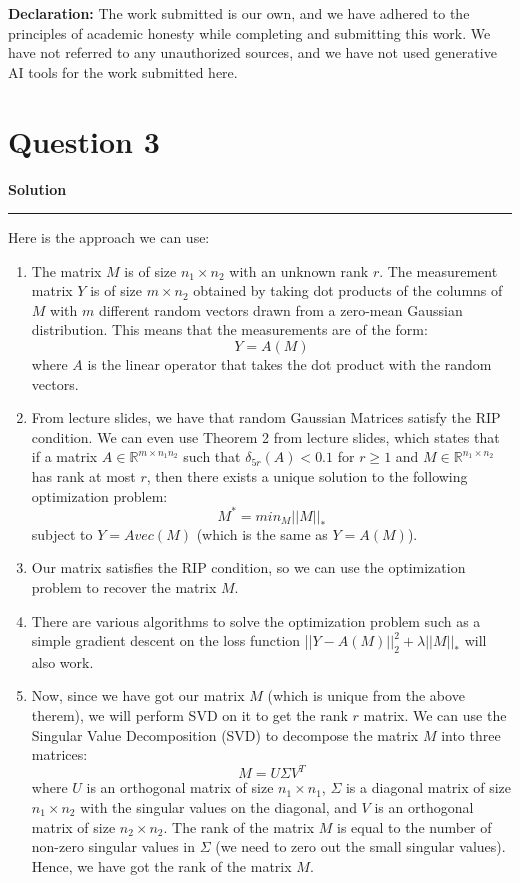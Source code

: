 \documentclass[a4paper,12pt]{article}
\title{\cooltitle{CS754 Assignment-4}}
\author{{\bf Saksham Rathi, Ekansh Ravi Shankar, Kshitij Vaidya}}
\date{}
\newenvironment{solution}[2][]{%
    \begin{mdframed}[linecolor=blue!70!black, linewidth=2pt, roundcorner=10pt, backgroundcolor=yellow!10!white, skipabove=12pt, skipbelow=12pt]%
        \textbf{\large #2}
        \par\noindent\rule{\textwidth}{0.4pt}
}{
    \end{mdframed}
}
\begin{document}
\maketitle
\textbf{Declaration:} The work submitted is our own, and
we have adhered to the principles of academic honesty while completing and submitting this work. We have not referred to any unauthorized sources, and we have not used generative AI tools for the work submitted here.

\section*{Question 3}

\begin{solution}{Solution}
Here is the approach we can use:
\begin{enumerate}
  \item The matrix $M$ is of size $n_1 \times n_2$ with an unknown rank $r$. The measurement matrix $Y$ is of size $m \times n_2$ obtained by taking dot products of the columns of $M$ with $m$ different random vectors drawn from a zero-mean Gaussian distribution. This means that the measurements are of the form:
  \[
  Y = A(M)
  \]
  where $A$ is the linear operator that takes the dot product with the random vectors.
  \item From lecture slides, we have that random Gaussian Matrices satisfy the RIP condition. We can even use Theorem 2 from lecture slides, which states that if a matrix $A \in \mathbb{R}^{m\times n_1n_2}$ such that $\delta_{5r}(A) < 0.1$ for $r \geq 1$ and $M \in \mathbb{R}^{n_1\times n_2}$ has rank at most $r$, then there exists a unique solution to the following optimization problem:
  \[M^* = min_M||M||_*\] 
  subject to $Y = Avec(M)$ (which is the same as $Y = A(M)$).
  \item Our matrix satisfies the RIP condition, so we can use the optimization problem to recover the matrix $M$.
  \item There are various algorithms to solve the optimization problem such as a simple gradient descent on the loss function ||$Y - A(M)||_2^2 + \lambda ||M||_*$ will also work. 
  \item Now, since we have got our matrix $M$ (which is unique from the above therem), we will perform SVD on it to get the rank $r$ matrix. We can use the Singular Value Decomposition (SVD) to decompose the matrix $M$ into three matrices:
  \[ M = U \Sigma V^T \]
  where $U$ is an orthogonal matrix of size $n_1 \times n_1$, $\Sigma$ is a diagonal matrix of size $n_1 \times n_2$ with the singular values on the diagonal, and $V$ is an orthogonal matrix of size $n_2 \times n_2$. The rank of the matrix $M$ is equal to the number of non-zero singular values in $\Sigma$ (we need to zero out the small singular values). Hence, we have got the rank of the matrix $M$.
\end{enumerate}

\end{solution}
\end{document}
